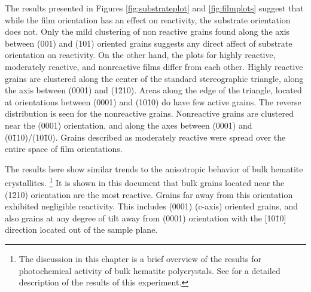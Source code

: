 The results presented in Figures \ref{fig:substrateplot} and \ref{fig:filmplots} suggest
that while the film orientation has an effect on reactivity, the substrate orientation
does not. Only the mild clustering of non reactive grains found along the axis between
(001) and (101) oriented grains suggests any direct affect of substrate orientation on
reactivity. On the other hand, the plots for highly reactive, moderately reactive, and
nonreactive films differ from each other. Highly reactive grains are clustered along the
center of the standard stereographic triangle, along the axis between (0001) and
(1\={2}10). Areas along the edge of the triangle, located at orientations between (0001)
and (10\={1}0) do have few active grains. The reverse distribution is seen for the
nonreactive grains. Nonreactive grains are clustered near the (0001) orientation, and
along the axes between (0001) and (0\={1}10)/(10\={1}0). Grains described as moderately
reactive were spread over the entire space of film orientations. 

The results here show similar trends to the anisotropic behavior of bulk hematite
crystallites.%
\footnote{%
	The discussion in this chapter is a brief overview of the results for photochemical
activity of bulk hematite polycrystals. See  for a
detailed description of the results of this experiment.
} 
It is shown in this document that bulk  grains located near the (1\={2}10)
orientation are the most reactive. Grains far away from this orientation exhibited
negligible reactivity. This includes (0001) (c-axis) oriented grains, and also grains at
any degree of tilt away from (0001) orientation with the [10\={1}0] direction located out
of the sample plane. 

